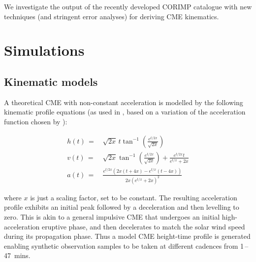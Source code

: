 \documentclass[structabstract]{aa}
\begin{document}
We investigate the output of the recently developed CORIMP catalogue with new techniques (and stringent error analyses) for deriving CME kinematics. %



\section{Simulations}
\label{sect:simulations}

\subsection{Kinematic models}
\label{subsect:kinematic_model}

A theoretical CME with non-constant acceleration is modelled by the following kinematic profile equations (as used in \citealt{2012ApJ...752..145B}, based on a variation of the acceleration function chosen by \citealt{2003ApJ...588L..53G}):

\begin{eqnarray}
h(t)\,=&\,\sqrt{2x}\,t\tan^{-1}\left(\frac{e^{t/2x}}{\sqrt{2x}}\right) \\
v(t)\,=&\,\sqrt{2x}\tan^{-1}\left(\frac{e^{t/2x}}{\sqrt{2x}}\right)+\frac{e^{t/2x}t}{e^{t/x}+2x} \\
a(t)\,=&\,\frac{e^{t/2x}\left(2x\left(t+4x\right)-e^{t/x}\left(t-4x\right)\right)}{2x\left(e^{t/x}+2x\right)^2}
\end{eqnarray}

where $x$ is just a scaling factor, set to be constant. The resulting acceleration profile exhibits an initial peak followed by a deceleration and then levelling to zero. This is akin to a general impulsive CME that undergoes an initial high-acceleration eruptive phase, and then decelerates to match the solar wind speed during its propagation phase. Thus a model CME height-time profile is generated enabling synthetic observation samples to be taken at different cadences from 1\,--\,47~mins. 
\end{document}
